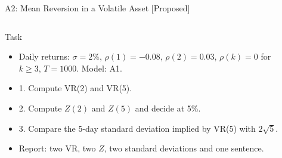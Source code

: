 \begin{frame}{A2: Mean Reversion in a Volatile Asset [Proposed]}
\propsub
\itemsize{\scriptsize}
\begin{columns}[T]
\begin{column}{\taskw}
\begin{block}{Task}
\begin{itemize}
    \item Daily returns: $\sigma = 2\%$, $\rho(1) = -0.08$, $\rho(2) = 0.03$, $\rho(k) = 0$ for $k \ge 3$, $T = 1000$. Model: A1.
    \item 1. Compute VR(2) and VR(5).
    \item 2. Compute $Z(2)$ and $Z(5)$ and decide at 5\%.
    \item 3. Compare the 5-day standard deviation implied by VR(5) with $2\sqrt5$.
    \item Report: two VR, two $Z$, two standard deviations and one sentence.
\end{itemize}
\end{block}
\end{column}
\begin{column}{\solw}
\end{column}
\end{columns}
\end{frame}

